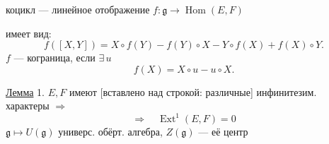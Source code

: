 коцикл --- линейное отображение \(f:\mathfrak g\longrightarrow\operatorname{Hom}(E,F)\)

 имеет вид:
\begin{equation*}
f([X,Y])=X\circ f(Y)-f(Y)\circ X-Y\circ f(X)+f(X)\circ Y.
\tag{4}
\end{equation*}
\(f\) --- кограница, если \(\exists\,u\)
\begin{equation*}
f(X)=X\circ u-u\circ X.
\tag{5}
\end{equation*}

\underline{Лемма} 1. \(E,F\) имеют [вставлено над строкой: различные]
инфинитезим. характеры \(\Rightarrow\)
\[
\Rightarrow\quad\operatorname{Ext}^1(E,F)=0
\]
\(\mathfrak g\longmapsto U(\mathfrak g)\)\qquad
универс. обёрт. алгебра, \(Z(\mathfrak g)\) --- её центр


